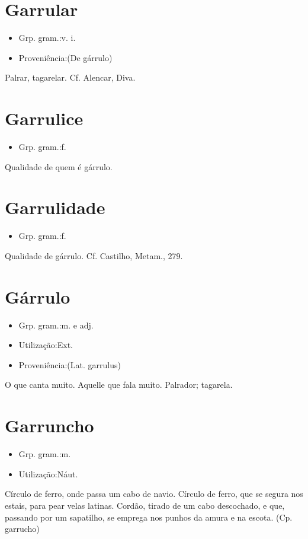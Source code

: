 \section{Garrular}
\begin{itemize}
\item {Grp. gram.:v. i.}
\end{itemize}
\begin{itemize}
\item {Proveniência:(De \textunderscore gárrulo\textunderscore )}
\end{itemize}
Palrar, tagarelar. Cf. Alencar, \textunderscore Diva\textunderscore .
\section{Garrulice}
\begin{itemize}
\item {Grp. gram.:f.}
\end{itemize}
Qualidade de quem é gárrulo.
\section{Garrulidade}
\begin{itemize}
\item {Grp. gram.:f.}
\end{itemize}
Qualidade de gárrulo. Cf. Castilho, \textunderscore Metam.\textunderscore , 279.
\section{Gárrulo}
\begin{itemize}
\item {Grp. gram.:m.  e  adj.}
\end{itemize}
\begin{itemize}
\item {Utilização:Ext.}
\end{itemize}
\begin{itemize}
\item {Proveniência:(Lat. \textunderscore garrulus\textunderscore )}
\end{itemize}
O que canta muito.
Aquelle que fala muito.
Palrador; tagarela.
\section{Garruncho}
\begin{itemize}
\item {Grp. gram.:m.}
\end{itemize}
\begin{itemize}
\item {Utilização:Náut.}
\end{itemize}
Círculo de ferro, onde passa um cabo de navio.
Círculo de ferro, que se segura nos estais, para pear velas latinas.
Cordão, tirado de um cabo descochado, e que, passando por um sapatilho, se emprega nos punhos da amura e na escota.
(Cp. \textunderscore garrucho\textunderscore )
